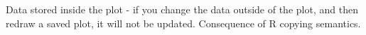Data stored inside the plot - if you change the data outside of the plot, and then redraw a saved plot, it will not be updated.  Consequence of R copying semantics.



% 
% 
%   
%     
% 
% 
